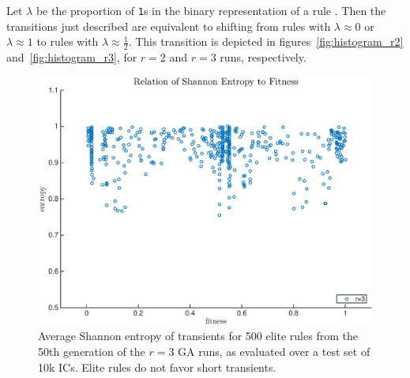 Let $\lambda$ be the proportion of \texttt{1}s in the binary representation of a rule \cite{Mitchell:1994:ECA:186092.186116}. Then the transitions 
just described are equivalent to shifting from rules with $\lambda \approx 0$ or $\lambda \approx 1$ to rules with $\lambda \approx \frac{1}{2}$. 
This transition is depicted in 
figures~\ref{fig:histogram_r2} and~\ref{fig:histogram_r3}, for $r = 2$ and $r = 3$ runs, respectively.

\begin{figure} [H]
\begin{center}
\includegraphics[width=\linewidth]{figures/entropy_fitness_plot.eps}
\caption{Average Shannon entropy of transients for 500 elite rules from the 50th generation of the $r = 3$ GA runs, as evaluated over a test set of 
10k ICs. Elite rules do not favor short transients. }
\label{fig:transients}
\end{center}
\end{figure}

